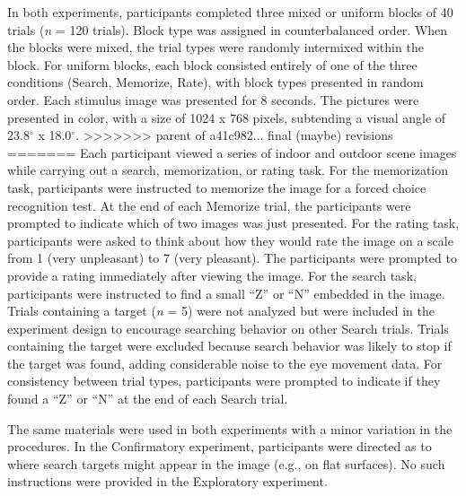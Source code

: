 \documentclass[
  english,
  man, donotrepeattitle,floatsintext]{apa6}
\begin{document}
In both experiments, participants completed three mixed or uniform blocks of 40 trials (\emph{n} = 120 trials). Block type was assigned in counterbalanced order. When the blocks were mixed, the trial types were randomly intermixed within the block. For uniform blocks, each block consisted entirely of one of the three conditions (Search, Memorize, Rate), with block types presented in random order. Each stimulus image was presented for 8 seconds. The pictures were presented in color, with a size of 1024 x 768 pixels, subtending a visual angle of 23.8\(^{\circ}\) x 18.0\(^{\circ}\).
>>>>>>> parent of a41c982... final (maybe) revisions
=======
Each participant viewed a series of indoor and outdoor scene images while carrying out a search, memorization, or rating task. For the memorization task, participants were instructed to memorize the image for a forced choice recognition test. At the end of each Memorize trial, the participants were prompted to indicate which of two images was just presented. For the rating task, participants were asked to think about how they would rate the image on a scale from 1 (very unpleasant) to 7 (very pleasant). The participants were prompted to provide a rating immediately after viewing the image. For the search task, participants were instructed to find a small \enquote{Z} or \enquote{N} embedded in the image. Trials containing a target (\emph{n} = 5) were not analyzed but were included in the experiment design to encourage searching behavior on other Search trials. Trials containing the target were excluded because search behavior was likely to stop if the target was found, adding considerable noise to the eye movement data. For consistency between trial types, participants were prompted to indicate if they found a \enquote{Z} or \enquote{N} at the end of each Search trial.

The same materials were used in both experiments with a minor variation in the procedures. In the Confirmatory experiment, participants were directed as to where search targets might appear in the image (e.g., on flat surfaces). No such instructions were provided in the Exploratory experiment.
\end{document}
